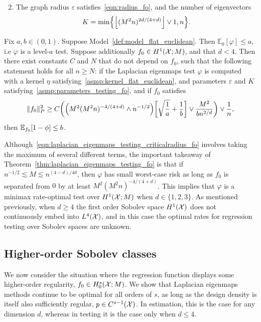 \begin{enumerate}[label=(P\arabic*)]
	\setcounter{enumi}{1}
	\item 
	\label{asmp:parameters_testing_fo}
	The graph radius $\varepsilon$ satisfies~\eqref{eqn:radius_fo}, and the number of eigenvectors 
	\begin{equation}
	\label{eqn:eigenvector_testing_fo}
	K = \min\Bigl\{\left\lfloor (M^2n)^{2d/(4 + d)} \right\rfloor \vee 1, n\Bigr\}.
	\end{equation}
\end{enumerate}
\begin{theorem}
	\label{thm:laplacian_eigenmaps_testing_fo}
	Fix $a,b \in (0,1)$. Suppose Model~\ref{def:model_flat_euclidean}. Then $\mathbb{E}_0[\varphi] \leq a$, i.e $\varphi$ is a level-$a$ test. Suppose additionally $f_0 \in H^1(\mathcal{X};M)$, and that $d < 4$. Then there exist constants $C$ and $N$ that do not depend on $f_0$, such that the following statement holds for all $n \geq N$: if the Laplacian eigenmaps test $\varphi$ is computed with a kernel $\eta$ satisfying~\ref{asmp:kernel_flat_euclidean}, and parameters $\varepsilon$ and $K$ satisfying~\ref{asmp:parameters_testing_fo}, and if $f_0$ satisfies
	\begin{equation}
	\label{eqn:laplacian_eigenmaps_testing_criticalradius_fo}
	\|f_0\|_P^2 \geq C\biggl(\Bigl(M^2(M^2n)^{-4/(4 + d) } \wedge n^{-1/2}\Bigr)\biggl[\sqrt{\frac{1}{a}} + \frac{1}{b}\biggr] \vee \frac{M^2}{b n^{2/d}} \biggr) \vee \frac{1}{n},
	\end{equation}
	then $\mathbb{E}_{f_0}[1 - \phi] \leq b$.
\end{theorem}
Although~\eqref{eqn:laplacian_eigenmaps_testing_criticalradius_fo} involves taking the maximum of several different terms, the important takeaway of Theorem~\ref{thm:laplacian_eigenmaps_testing_fo} is that if $n^{-1/2} \lesssim M \lesssim n^{(4 - d)/4d}$, then $\varphi$ has small worst-case risk as long as $f_0$ is separated from $0$ by at least $M^2(M^2n)^{-4/(4 + d)}$. This implies that $\varphi$ is a minimax rate-optimal test over $H^1(\mathcal{X};M)$ when $d \in \{1,2,3\}$. As mentioned previously, when $d \geq 4$ the first order Sobolev space $H^1(\mathcal{X})$ does not continuously embed into $L^4(\mathcal{X})$, and in this case the optimal rates for regression testing over Sobolev spaces are unknown.

\subsection{Higher-order Sobolev classes}
\label{sec:higher_order_sobolev_classes}
We now consider the situation where the regression function displays some higher-order regularity, $f_0 \in H_0^s(\mathcal{X};M)$. We show that Laplacian eigenmaps methods continue to be optimal for all orders of $s$, as long as the design density is itself also sufficiently regular, $p \in C^{s - 1}(\mathcal{X})$. In estimation, this is the case for any dimension $d$, whereas in testing it is the case only when $d \leq 4$. 

